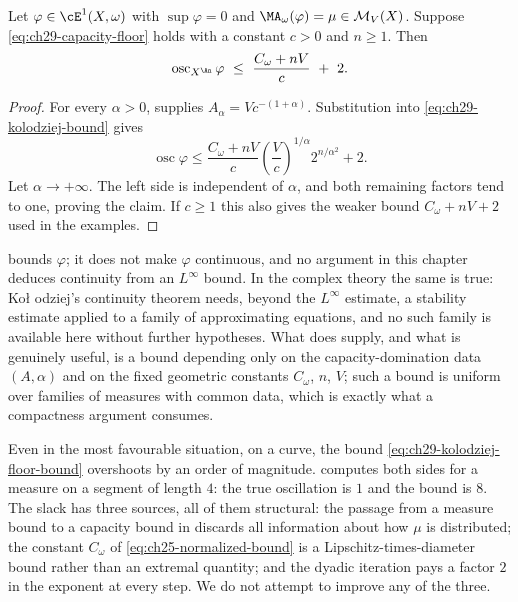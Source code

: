 \begin{corollary}
\label{cor:ch29-kolodziej-floor}
Let $\varphi\in\cE^1(X,\omega)$ with $\sup\varphi=0$ and
$\MA_\omega(\varphi)=\mu\in\mathcal M_V(X)$.  Suppose
\eqref{eq:ch29-capacity-floor} holds with a constant $c>0$ and
$n\geq1$.  Then
\begin{equation}
\label{eq:ch29-kolodziej-floor-bound}
 \operatorname{osc}_{X^{\An}}\varphi
 \ \leq\ \frac{C_\omega+nV}{c}\ +\ 2 .
\end{equation}
\end{corollary}

\begin{proof}
For every $\alpha>0$,  supplies
$A_\alpha=Vc^{-(1+\alpha)}$.  Substitution into
\eqref{eq:ch29-kolodziej-bound} gives
\[
 \operatorname{osc}\varphi
 \leq \frac{C_\omega+nV}{c}
          \left(\frac Vc\right)^{1/\alpha}2^{n/\alpha^2}+2 .
\]
Let $\alpha\to+\infty$.  The left side is independent of $\alpha$,
and both remaining factors tend to one, proving the claim.  If $c\geq1$
this also gives the weaker bound $C_\omega+nV+2$ used in the examples.
\end{proof}

\begin{remark}
\label{rem:ch29-linfty-scope}
 bounds $\varphi$; it does not make
$\varphi$ continuous, and no argument in this chapter deduces continuity
from an $L^\infty$ bound.  In the complex theory the same is true: Ko\l
odziej's continuity theorem needs, beyond the $L^\infty$ estimate, a
stability estimate applied to a family of approximating equations, and no
such family is available here without further hypotheses.  What
 does supply, and what is genuinely useful,
is a bound depending only on the capacity-domination data $(A,\alpha)$ and
on the fixed geometric constants $C_\omega$, $n$, $V$; such a bound is
uniform over families of measures with common data, which is exactly what a
compactness argument consumes.
\end{remark}

\begin{remark}
\label{rem:ch29-linfty-slack}
Even in the most favourable situation, on a curve, the bound
\eqref{eq:ch29-kolodziej-floor-bound} overshoots by an order of magnitude.
 computes both sides for a measure on a segment
of length $4$: the true oscillation is $1$ and the bound is $8$.  The
slack has three sources, all of them structural: the passage from a measure
bound to a capacity bound in  discards all
information about how $\mu$ is distributed; the constant $C_\omega$ of
\eqref{eq:ch25-normalized-bound} is a Lipschitz-times-diameter bound rather
than an extremal quantity; and the dyadic iteration pays a factor $2$ in
the exponent at every step.  We do not attempt to improve any of the three.
\end{remark}

